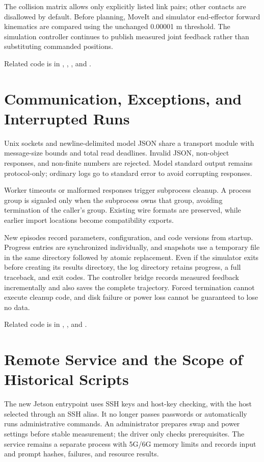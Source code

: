The collision matrix allows only explicitly listed link pairs; other contacts are disallowed by default. Before planning, MoveIt and simulator end-effector forward kinematics are compared using the unchanged 0.00001 m threshold. The simulation controller continues to publish measured joint feedback rather than substituting commanded positions.

Related code is in , , , and .

\section{Communication, Exceptions, and Interrupted Runs}
Unix sockets and newline-delimited model JSON share a transport module with message-size bounds and total read deadlines. Invalid JSON, non-object responses, and non-finite numbers are rejected. Model standard output remains protocol-only; ordinary logs go to standard error to avoid corrupting responses.

Worker timeouts or malformed responses trigger subprocess cleanup. A process group is signaled only when the subprocess owns that group, avoiding termination of the caller's group. Existing wire formats are preserved, while earlier import locations become compatibility exports.

New episodes record parameters, configuration, and code versions from startup. Progress entries are synchronized individually, and snapshots use a temporary file in the same directory followed by atomic replacement. Even if the simulator exits before creating its results directory, the log directory retains progress, a full traceback, and exit codes. The controller bridge records measured feedback incrementally and also saves the complete trajectory. Forced termination cannot execute cleanup code, and disk failure or power loss cannot be guaranteed to lose no data.

Related code is in , , and .

\section{Remote Service and the Scope of Historical Scripts}
The new Jetson entrypoint uses SSH keys and host-key checking, with the host selected through an SSH alias. It no longer passes passwords or automatically runs administrative commands. An administrator prepares swap and power settings before stable measurement; the driver only checks prerequisites. The service remains a separate process with 5G/6G memory limits and records input and prompt hashes, failures, and resource results.

